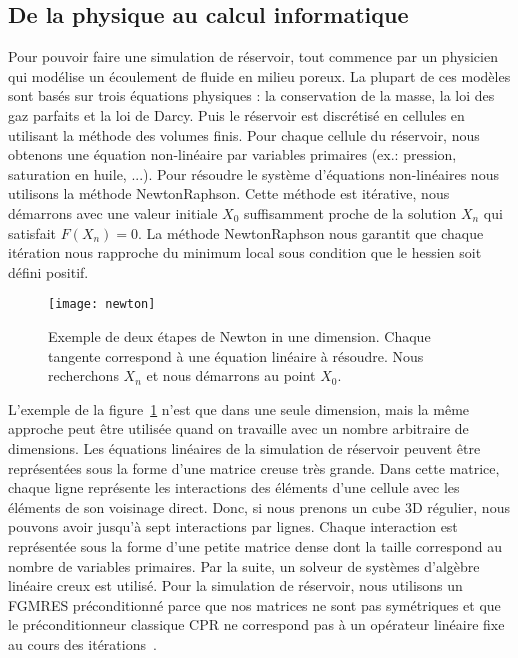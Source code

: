 \subsection{De la physique au calcul informatique}
Pour pouvoir faire une simulation de réservoir, tout commence par un physicien qui modélise un écoulement de fluide en milieu poreux.
%
La plupart de ces modèles sont basés sur trois équations physiques : la conservation de la masse, la loi des gaz parfaits et la loi de Darcy.
%
Puis le réservoir est discrétisé en cellules en utilisant la méthode des volumes finis.
%
Pour chaque cellule du réservoir, nous obtenons une équation non-linéaire par variables primaires (ex.: pression, saturation en huile, ...).
%
Pour résoudre le système d'équations non-linéaires nous utilisons la méthode NewtonRaphson.
%
Cette méthode est itérative, nous démarrons avec une valeur initiale $X_0$ suffisamment proche de la solution $X_n$ qui satisfait $F(X_n) = 0$.
%
La méthode NewtonRaphson nous garantit que chaque itération nous rapproche du minimum local sous condition que le hessien soit défini positif.
\begin{figure}[!h]
  \centering
  \texttt{[image: newton]}
  \caption{Exemple de deux étapes de Newton in une dimension.
    Chaque tangente correspond à une équation linéaire à résoudre.
    Nous recherchons $X_n$ et nous démarrons au point $X_0$.}
\label{fig:newton}
\end{figure}
L'exemple de la figure~\ref{fig:newton} n'est que dans une seule dimension, mais la même approche peut être utilisée quand on travaille avec un nombre arbitraire de dimensions.
%
Les équations linéaires de la simulation de réservoir peuvent être représentées sous la forme d'une matrice creuse très grande.
%
Dans cette matrice, chaque ligne représente les interactions des éléments d'une cellule avec les éléments de son voisinage direct.
%
Donc, si nous prenons un cube 3D régulier, nous pouvons avoir jusqu'à sept interactions par lignes.
%
Chaque interaction est représentée sous la forme d'une petite matrice dense dont la taille correspond au nombre de variables primaires.
%
Par la suite, un solveur de systèmes d'algèbre linéaire creux est utilisé.
%
Pour la simulation de réservoir, nous utilisons un FGMRES préconditionné parce que nos matrices ne sont pas symétriques et que le préconditionneur classique CPR ne correspond pas à un opérateur linéaire fixe au cours des itérations~\cite{cao2005parallel}.
